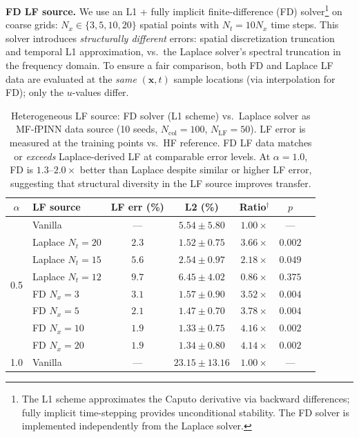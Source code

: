 \documentclass[preprint,12pt]{elsarticle}
\newcommand{\Ncol}{N_{\mathrm{col}}}
\newcommand{\NLF}{N_{\mathrm{LF}}}
\begin{document}
\textbf{FD LF source.} We use an L1 + fully implicit finite-difference (FD) solver\footnote{The L1 scheme \cite{sun2006fully} approximates the Caputo derivative via backward differences; fully implicit time-stepping provides unconditional stability. The FD solver is implemented independently from the Laplace solver.} on coarse grids: $N_x \in \{3, 5, 10, 20\}$ spatial points with $N_t = 10 N_x$ time steps. This solver introduces \emph{structurally different} errors: spatial discretization truncation and temporal L1 approximation, vs.\ the Laplace solver's spectral truncation in the frequency domain. To ensure a fair comparison, both FD and Laplace LF data are evaluated at the \emph{same} $(\mathbf{x}, t)$ sample locations (via interpolation for FD); only the $u$-values differ.

\begin{table}[t]
\centering
\caption{Heterogeneous LF source: FD solver (L1 scheme) vs.\ Laplace solver as MF-fPINN data source (10 seeds, $\Ncol = 100$, $\NLF = 50$). LF error is measured at the training points vs.\ HF reference. FD LF data matches or \emph{exceeds} Laplace-derived LF at comparable error levels. At $\alpha = 1.0$, FD is $1.3$--$2.0\times$ better than Laplace despite similar or higher LF error, suggesting that structural diversity in the LF source improves transfer.}
\label{tab:heterogeneous}
\begin{tabular}{clccccc}
\toprule
$\alpha$ & LF source & LF err (\%) & L2 (\%) & Ratio$^\dagger$ & $p$ \\
\midrule
\multirow{8}{*}{0.5}
& Vanilla          & ---  & $5.54 \pm 5.80$  & $1.00\times$ & --- \\
& Laplace $N_t{=}20$ & $2.3$ & $1.52 \pm 0.75$  & $3.66\times$ & $0.002$ \\
& Laplace $N_t{=}15$ & $5.6$ & $2.54 \pm 0.97$  & $2.18\times$ & $0.049$ \\
& Laplace $N_t{=}12$ & $9.7$ & $6.45 \pm 4.02$  & $0.86\times$ & $0.375$ \\
\cmidrule{2-6}
& FD $N_x{=}3$  & $3.1$ & $1.57 \pm 0.90$  & $3.52\times$ & $0.004$ \\
& FD $N_x{=}5$  & $2.1$ & $1.47 \pm 0.70$  & $3.78\times$ & $0.004$ \\
& FD $N_x{=}10$ & $1.9$ & $\mathbf{1.33 \pm 0.75}$  & $\mathbf{4.16\times}$ & $0.002$ \\
& FD $N_x{=}20$ & $1.9$ & $1.34 \pm 0.80$  & $4.14\times$ & $0.002$ \\
\midrule
\multirow{8}{*}{1.0}
& Vanilla          & ---  & $23.15 \pm 13.16$ & $1.00\times$ & --- \\

\end{tabular}
\end{table}
\end{document}
